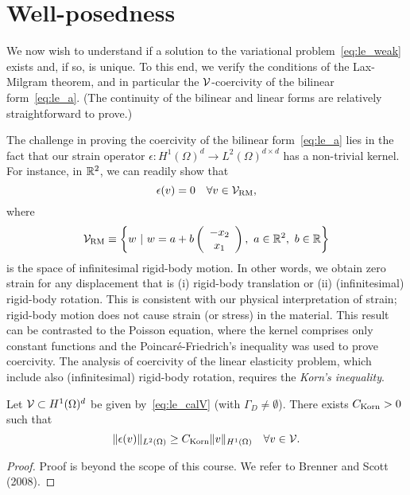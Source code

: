 \section{Well-posedness}
\label{sec:le_wellposed}
We now wish to understand if a solution to the variational problem~\eqref{eq:le_weak} exists and, if so, is unique.  To this end, we verify the conditions of the Lax-Milgram theorem, and in particular the $\calV$-coercivity of the bilinear form~\eqref{eq:le_a}.  (The continuity of the bilinear and linear forms are relatively straightforward to prove.)

The challenge in proving the coercivity of the bilinear form~\eqref{eq:le_a} lies in the fact that our strain operator $\epsilon: H^1(\Omega)^d \to L^2(\Omega)^{d \times d}$ has a non-trivial kernel. For instance, in $\RR^2$, we can readily show that
\begin{equation*}
  \epsilon(v) = 0 \quad \forall v \in \calV_{\rm RM},
\end{equation*}
where
\begin{equation*}
  \calV_{\rm RM} \equiv \left\{ w \ | \ w = a + b \bmat{c} -x_2 \\ x_1 \emat, \ a \in \RR^2, \ b \in \RR \right\}
\end{equation*}
is  the space of infinitesimal rigid-body motion.  In other words, we obtain zero strain for any displacement that is (i) rigid-body translation or (ii) (infinitesimal) rigid-body rotation.  This is consistent with our physical interpretation of strain; rigid-body motion does not cause strain (or stress) in the material.  This result can be contrasted to the Poisson equation, where the kernel comprises only constant functions and the Poincar\'e-Friedrich's inequality was used to prove coercivity. The analysis of coercivity of the linear elasticity problem, which include also (infinitesimal) rigid-body rotation, requires the \emph{Korn's inequality}.
\begin{theorem}
  Let $\calV \subset H^1(\Omega)^d$ be given by~\eqref{eq:le_calV} (with $\Gamma_D \neq \emptyset$).  There exists $C_{\rm Korn} > 0$ such that
  \begin{equation*}
    \| \epsilon(v) \|_{L^2(\Omega)} \geq C_{\rm Korn} \| v \|_{H^1(\Omega)} \quad \forall v \in \calV.
  \end{equation*}
  \begin{proof}
    Proof is beyond the scope of this course.  We refer to Brenner and Scott (2008).
  \end{proof}
\end{theorem}

